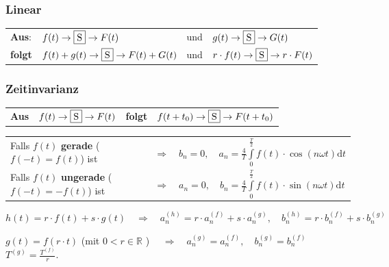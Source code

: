 	    \subsubsection{Linear}
	    \begin{tabular}{llll}
            \textbf{Aus}: &
            $f(t)\to \fbox{S}\to F(t)$ &
            und &
            $g(t)\to \fbox{S}\to G(t)$ \\
            \textbf{folgt} &
            $f(t)+g(t)\to \fbox{S}\to F(t)+G(t)$ &
            und &
            $r\cdot f(t)\to\fbox{S}\to r\cdot F(t)$ \\
        \end{tabular}
        \subsubsection{Zeitinvarianz}
        \begin{tabular}{llll}
            \textbf{Aus} &
            $f(t)\to \fbox{S}\to F(t)$ &
            \textbf{folgt} &
            $f(t+t_0)\to \fbox{S}\to F(t+t_0)$\\
        \end{tabular}
		\begin{tabular}{ll}
   			Falls $f(t)$ \textbf{gerade} ($ f(-t)=f(t) $) ist 
   			& $\quad \Longrightarrow \quad 
			b_n = 0, \quad a_n = \frac{4}{T} \int\limits_0^{\frac{T}{2}} f(t) \cdot
			\cos(n \omega t) \mathrm{d}t$ \\
			Falls $f(t)$ \textbf{ungerade} ($ f(-t)=-f(t) $) ist
			&$\quad \Longrightarrow \quad a_n = 0, \quad b_n =  \frac{4}{T} 
			\int\limits_0^{\frac{T}{2}} f(t) \cdot \sin(n \omega t) \mathrm{d}t$
      	\end{tabular}
			 
			$h(t) = r \cdot f(t) + s \cdot g(t) \quad \Longrightarrow \quad a_n^{(h)} = r \cdot
			a_n^{(f)} + s \cdot a_n^{(g)}, \quad b_n^{(h)} = r \cdot b_n^{(f)} + s \cdot b_n^{(g)}$
			
			$g(t) = f(r \cdot t) $ (mit $ 0 < r \in \mathbb{R}$ ) $\quad \Longrightarrow\quad  
			a_n^{(g)} = a_n^{(f)}, \quad b_n^{(g)} = b_n^{(f)} $ \quad $T^{(g)} = \frac{T^{(f)}}{r}$.
			
